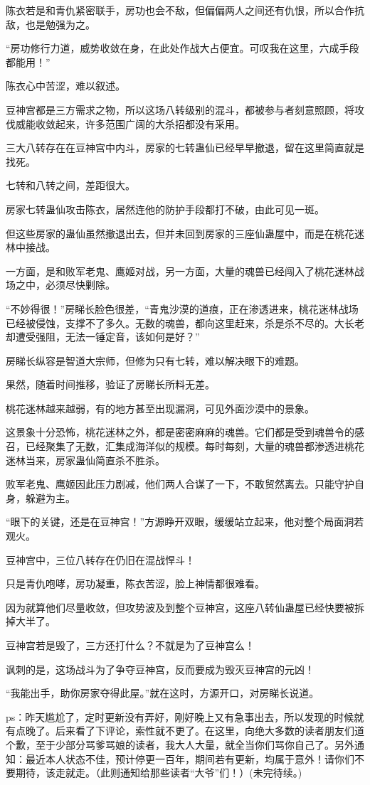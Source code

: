 \begin{this_body}
陈衣若是和青仇紧密联手，房功也会不敌，但偏偏两人之间还有仇恨，所以合作抗敌，也是勉强为之。

“房功修行力道，威势收敛在身，在此处作战大占便宜。可叹我在这里，六成手段都能用！”

陈衣心中苦涩，难以叙述。

豆神宫都是三方需求之物，所以这场八转级别的混斗，都被参与者刻意照顾，将攻伐威能收敛起来，许多范围广阔的大杀招都没有采用。

三大八转存在在豆神宫中内斗，房家的七转蛊仙已经早早撤退，留在这里简直就是找死。

七转和八转之间，差距很大。

房家七转蛊仙攻击陈衣，居然连他的防护手段都打不破，由此可见一斑。

但这些房家的蛊仙虽然撤退出去，但并未回到房家的三座仙蛊屋中，而是在桃花迷林中接战。

一方面，是和败军老鬼、鹰姬对战，另一方面，大量的魂兽已经闯入了桃花迷林战场之中，必须尽快剿除。

“不妙得很！”房睇长脸色很差，“青鬼沙漠的道痕，正在渗透进来，桃花迷林战场已经被侵蚀，支撑不了多久。无数的魂兽，都向这里赶来，杀是杀不尽的。大长老却遭受强阻，无法一锤定音，该如何是好？”

房睇长纵容是智道大宗师，但修为只有七转，难以解决眼下的难题。

果然，随着时间推移，验证了房睇长所料无差。

桃花迷林越来越弱，有的地方甚至出现漏洞，可见外面沙漠中的景象。

这景象十分恐怖，桃花迷林之外，都是密密麻麻的魂兽。它们都是受到魂兽令的感召，已经聚集了无数，汇集成海洋似的规模。每时每刻，大量的魂兽都渗透进桃花迷林当来，房家蛊仙简直杀不胜杀。

败军老鬼、鹰姬因此压力剧减，他们两人合谋了一下，不敢贸然离去。只能守护自身，躲避为主。

“眼下的关键，还是在豆神宫！”方源睁开双眼，缓缓站立起来，他对整个局面洞若观火。

豆神宫中，三位八转存在仍旧在混战悍斗！

只是青仇咆哮，房功凝重，陈衣苦涩，脸上神情都很难看。

因为就算他们尽量收敛，但攻势波及到整个豆神宫，这座八转仙蛊屋已经快要被拆掉大半了。

豆神宫若是毁了，三方还打什么？不就是为了豆神宫么！

讽刺的是，这场战斗为了争夺豆神宫，反而要成为毁灭豆神宫的元凶！

“我能出手，助你房家夺得此屋。”就在这时，方源开口，对房睇长说道。

ps：昨天尴尬了，定时更新没有弄好，刚好晚上又有急事出去，所以发现的时候就有点晚了。后来看了下评论，索性就不更了。在这里，向绝大多数的读者朋友们道个歉，至于少部分骂爹骂娘的读者，我大人大量，就全当你们骂你自己了。另外通知：最近本人状态不佳，预计停更一百年，期间若有更新，均属于意外！请你们不要期待，该走就走。（此则通知给那些读者“大爷”们！）(未完待续。)

\end{this_body}

